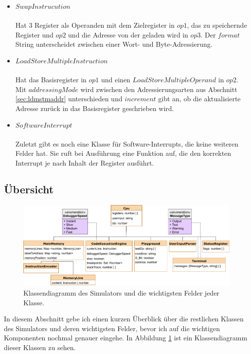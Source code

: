 \documentclass[a4paper, 11pt, onecolumn]{article}
\begin{document}
\begin{itemize}
\item $SwapInstrucution$\\ \\Hat 3 Register als Operanden mit dem Zielregister in $op1$, das zu speichernde Register und $op2$ und die Adresse von der geladen wird in $op3$. Der $format$ String unterscheidet zwischen einer Wort- und Byte-Adressierung.
\item $LoadStoreMultipleInstruction$\\ \\Hat das Basisregister in $op1$ und einen $LoadStoreMultipleOperand$ in $op2$. Mit $addressingMode$ wird zwischen den Adressierungsarten aus Abschnitt \ref{sec:ldmstmaddr} unterschieden und $increment$ gibt an, ob die aktualisierte Adresse zurück in das Basisregister geschrieben wird.
\item $SoftwareInterrupt$\\ \\Zuletzt gibt es noch eine Klasse für Software-Interrupts, die keine weiteren Felder hat. Sie ruft bei Ausführung eine Funktion auf, die den korrekten Interrupt je nach Inhalt der Register ausführt.
\end{itemize} 

\subsection{Übersicht}\label{sec:overview}

\begin{figure}[!htb]
\centering
\includegraphics[width=1\textwidth]{data/classdiagramm}
\caption{Klassendiagramm des Simulators und die wichtigsten Felder jeder Klasse.}
\label{fig:classdiagramm}
\end{figure}

In diesem Abschnitt gebe ich einen kurzen Überblick über die restlichen Klassen des Simulators und deren wichtigsten Felder, bevor ich auf die wichtigen Komponenten nochmal genauer eingehe. In Abbildung \ref{fig:classdiagramm} ist ein Klassendiagramm dieser Klassen zu sehen.
\end{document}
